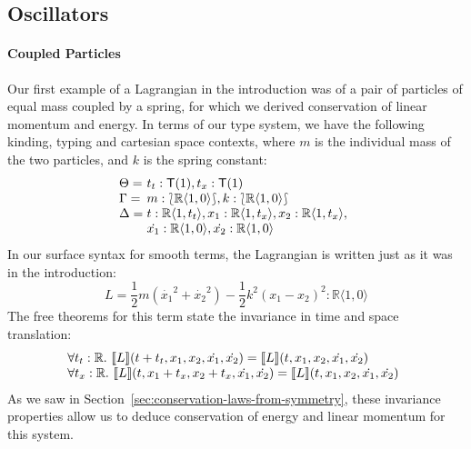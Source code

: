 \documentclass[preprint]{sigplanconf}
\newcommand{\typeOfCartSp}[1]{\lbag #1 \rbag}
\theoremstyle{examplestyle}
\newcommand{\sem}[1]{\llbracket #1 \rrbracket}
\begin{document}
\subsection{Oscillators}

\paragraph{Coupled Particles} Our first example of a Lagrangian in the
introduction was of a pair of particles of equal mass coupled by a
spring, for which we derived conservation of linear momentum and
energy. In terms of our type system, we have the following kinding,
typing and cartesian space contexts, where $m$ is the individual mass
of the two particles, and $k$ is the spring constant:
\begin{displaymath}
  \begin{array}{l@{\hspace{0.3em}}l}
    \Theta = & t_t : \mathsf{T}(1), t_x : \mathsf{T}(1) \\
    \Gamma = & m : \typeOfCartSp{\mathbb{R}\langle 1, 0 \rangle}, k : \typeOfCartSp{\mathbb{R}\langle 1, 0 \rangle} \\
    \Delta = &
    \begin{array}[t]{@{}l}
      t : \mathbb{R}\langle 1, t_t \rangle, x_1 : \mathbb{R}\langle 1, t_x \rangle, x_2 : \mathbb{R}\langle 1, t_x \rangle, \\
      \dot{x_1} : \mathbb{R}\langle 1, 0 \rangle, \dot{x_2} : \mathbb{R}\langle 1, 0 \rangle
\end{array}
  \end{array}
\end{displaymath}
In our surface syntax for smooth terms, the Lagrangian is written just
as it was in the introduction:
\begin{displaymath}
  L = \frac{1}{2}m(\dot{x_1}^2 + \dot{x_2}^2) - \frac{1}{2}k^2(x_1 - x_2)^2 : \mathbb{R}\langle 1, 0 \rangle
\end{displaymath}
The free theorems for this term state the invariance in time and space
translation:
\begin{displaymath}
  \begin{array}{@{}l}
    \forall t_t : \mathbb{R}.~\sem{L}(t + t_t, x_1, x_2, \dot{x_1}, \dot{x_2}) = \sem{L}(t, x_1, x_2, \dot{x_1}, \dot{x_2}) \\
    \forall t_x : \mathbb{R}.~\sem{L}(t, x_1 + t_x, x_2 + t_x, \dot{x_1}, \dot{x_2}) = \sem{L}(t, x_1, x_2, \dot{x_1}, \dot{x_2})
  \end{array}
\end{displaymath}
As we saw in Section~\ref{sec:conservation-laws-from-symmetry}, these
invariance properties allow us to deduce conservation of energy and
linear momentum for this system.
\end{document}
